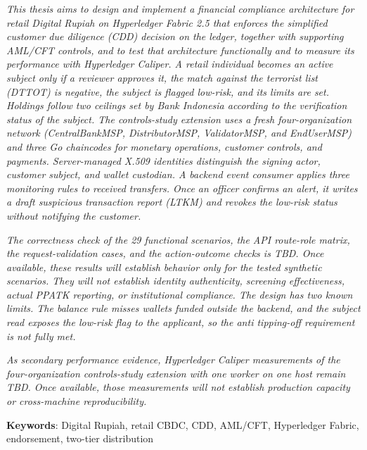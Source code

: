 \textit{
This thesis aims to design and implement a financial compliance architecture for retail
Digital Rupiah on Hyperledger Fabric 2.5 that enforces the simplified customer due diligence (CDD) decision on the ledger, together with supporting AML/CFT controls, and to test that architecture functionally and to measure its performance with Hyperledger Caliper. A retail individual becomes an active subject only if a reviewer approves it, the match against the terrorist list (DTTOT) is negative, the subject is flagged low-risk, and its limits are set. Holdings follow two ceilings set by Bank Indonesia according to the verification status of the subject. The controls-study extension uses a fresh four-organization network (CentralBankMSP, DistributorMSP,
ValidatorMSP, and EndUserMSP) and three Go chaincodes for monetary operations,
customer controls, and payments. Server-managed X.509 identities distinguish
the signing actor, customer subject, and wallet custodian. A backend event consumer applies three monitoring rules to received transfers. Once an officer confirms an alert, it writes a draft suspicious transaction report (LTKM) and revokes the low-risk status without notifying the customer.
}

\textit{
The correctness check of the 29 functional scenarios, the API route-role matrix, the request-validation cases, and the action-outcome checks is TBD. Once available, these results will establish behavior
only for the tested synthetic scenarios. They will not establish identity
authenticity, screening effectiveness, actual PPATK reporting, or institutional
compliance. The design has two known limits. The balance rule misses wallets funded outside the backend, and the subject read exposes the low-risk flag to the applicant, so the anti tipping-off requirement is not fully met.
}

\textit{
As secondary performance evidence, Hyperledger Caliper measurements of the four-organization controls-study extension with one worker on one host remain TBD. Once available, those measurements will not establish production capacity or cross-machine reproducibility.
}

\vspace{0.5cm}

\noindent\textbf{Keywords}: Digital Rupiah, retail CBDC, CDD, AML/CFT,
Hyperledger Fabric, endorsement, two-tier distribution
